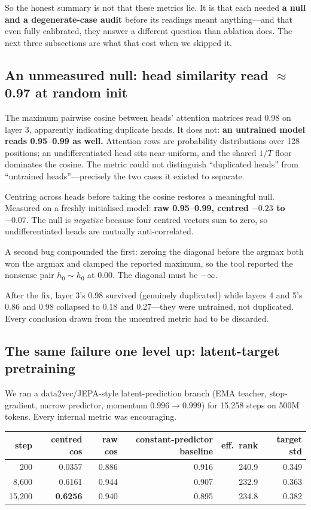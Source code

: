 \documentclass[11pt,a4paper]{article}
\begin{document}
So the honest summary is not that these metrics lie. It is that each needed \textbf{a null and
a degenerate-case audit} before its readings meant anything---and that even fully calibrated,
they answer a different question than ablation does. The next three subsections are what that
cost when we skipped it.

\subsection{An unmeasured null: head similarity read $\approx$0.97 at random init}

The maximum pairwise cosine between heads' attention matrices read 0.98 on layer 3, apparently
indicating duplicate heads. It does not: \textbf{an untrained model reads 0.95--0.99 as well.}
Attention rows are probability distributions over 128 positions; an undifferentiated head sits
near-uniform, and the shared $1/T$ floor dominates the cosine. The metric could not distinguish
``duplicated heads'' from ``untrained heads''---precisely the two cases it existed to separate.

Centring across heads before taking the cosine restores a meaningful null. Measured on a
freshly initialised model: \textbf{raw 0.95--0.99, centred $-0.23$ to $-0.07$}. The null is
\emph{negative} because four centred vectors sum to zero, so undifferentiated heads are
mutually anti-correlated.

A second bug compounded the first: zeroing the diagonal before the argmax both won the argmax
and clamped the reported maximum, so the tool reported the nonsense pair $h_0 \sim h_0$ at
0.00. The diagonal must be $-\infty$.

After the fix, layer 3's 0.98 survived (genuinely duplicated) while layers 4 and 5's 0.86 and
0.98 collapsed to 0.18 and 0.27---they were untrained, not duplicated. Every conclusion drawn
from the uncentred metric had to be discarded.

\subsection{The same failure one level up: latent-target pretraining}\label{sec:jepa}

We ran a data2vec/JEPA-style latent-prediction branch (EMA teacher, stop-gradient, narrow
predictor, momentum $0.996 \to 0.999$) for 15{,}258 steps on 500M tokens. Every internal metric
was encouraging.

\begin{center}\small
\begin{tabular}{rrrrrr}
\toprule
step & centred cos & raw cos & constant-predictor baseline & eff.\ rank & target std \\
\midrule
200     & 0.0357 & 0.886 & 0.916 & 240.9 & 0.349 \\
8{,}600 & 0.6161 & 0.944 & 0.907 & 232.9 & 0.363 \\
15{,}200& \textbf{0.6256} & 0.940 & 0.895 & 234.8 & 0.382 \\
\bottomrule
\end{tabular}
\end{center}
\end{document}
